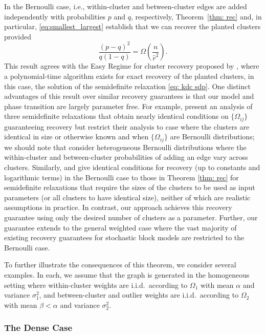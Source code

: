 \documentclass[twoside,11pt]{article}
\newcommand{\0}{\bs{0}}
\newcommand{\rbra}[1]{\ensuremath{\left( #1 \right)}} %
\begin{document}
{In the %
Bernoulli case, i.e., within-cluster and between-cluster edges are added independently with probabilities $p$ and $q$, respectively, Theorem~\ref{thm: rec} and, in particular,
\eqref{eq:smallest_largest} establish that we can recover the planted
clusters provided
\[
	\frac{(p-q)^2}{q(1-q)} = \Omega\rbra{ \frac{ n }{\hat r^2}}.
\]
This result agrees with the Easy Regime for cluster recovery
proposed by \cite{chen2014statistical}, where a polynomial-time
algorithm exists for exact recovery of the planted clusters, in this case, the solution of the semidefinite relaxation \eqref{eq: kdc sdp}.
One distinct advantages of this result over similar recovery guarantees
is that our model and phase transition are largely parameter free.
For example, \citet{amini2014semidefinite} present an analysis of three
semidefinite relaxations that obtain nearly identical conditions
on $\{\Omega_{ij}\}$ guaranteeing recovery but restrict their
analysis to case where the clusters are identical in size
or otherwise known and when $\{\Omega_{ij}\}$ are Bernoulli distributions; we should note that
\citet{amini2014semidefinite} consider heterogeneous Bernoulli
distributions where the within-cluster and between-cluster probabilities
of adding an edge vary across clusters.
Similarly, \citet{chen2014statistical} and \citet{jalali2015relative} give identical
conditions for recovery
(up to constants and logarithmic terms)
in the Bernoulli case
to those in Theorem \eqref{thm: rec} for
semidefinite relaxations that require the sizes of the clusters to
be used as input parameters (or all clusters to have identical size), neither
of which are realistic assumptions in practice.
In contrast, our approach achieves this recovery guarantee
using only the desired number of clusters as a parameter.
Further, our guarantee extends to the general weighted case where
the vast majority of existing recovery guarantees for stochastic
block models are restricted to the Bernoulli case.

To further illustrate the consequences of this theorem, we consider
several examples. In each, we assume that the graph is
generated in the homogeneous setting where
within-cluster weights are i.i.d.~according to $\Omega_1$ with mean $\alpha$ and variance $
\sigma_1^2$, and
between-cluster and outlier weights are i.i.d.~according to
$\Omega_2$ with mean $\beta < \alpha$ and variance $\sigma_2^2$.


\subsubsection{The Dense Case}

}
\end{document}
